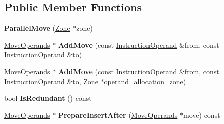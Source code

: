 \subsection*{Public Member Functions}
\begin{DoxyCompactItemize}
\item 
{\bfseries Parallel\+Move} (\hyperlink{classv8_1_1internal_1_1_zone}{Zone} $\ast$zone)\hypertarget{classv8_1_1internal_1_1compiler_1_1_parallel_move_aed2ca933d925ca250be848dc259c346e}{}\label{classv8_1_1internal_1_1compiler_1_1_parallel_move_aed2ca933d925ca250be848dc259c346e}

\item 
\hyperlink{classv8_1_1internal_1_1compiler_1_1_move_operands}{Move\+Operands} $\ast$ {\bfseries Add\+Move} (const \hyperlink{classv8_1_1internal_1_1compiler_1_1_instruction_operand}{Instruction\+Operand} \&from, const \hyperlink{classv8_1_1internal_1_1compiler_1_1_instruction_operand}{Instruction\+Operand} \&to)\hypertarget{classv8_1_1internal_1_1compiler_1_1_parallel_move_aaf0c874d2238b471f1fdfd94ff8b7245}{}\label{classv8_1_1internal_1_1compiler_1_1_parallel_move_aaf0c874d2238b471f1fdfd94ff8b7245}

\item 
\hyperlink{classv8_1_1internal_1_1compiler_1_1_move_operands}{Move\+Operands} $\ast$ {\bfseries Add\+Move} (const \hyperlink{classv8_1_1internal_1_1compiler_1_1_instruction_operand}{Instruction\+Operand} \&from, const \hyperlink{classv8_1_1internal_1_1compiler_1_1_instruction_operand}{Instruction\+Operand} \&to, \hyperlink{classv8_1_1internal_1_1_zone}{Zone} $\ast$operand\+\_\+allocation\+\_\+zone)\hypertarget{classv8_1_1internal_1_1compiler_1_1_parallel_move_a814609dc9d73a7e4c4ff72951d8e2d16}{}\label{classv8_1_1internal_1_1compiler_1_1_parallel_move_a814609dc9d73a7e4c4ff72951d8e2d16}

\item 
bool {\bfseries Is\+Redundant} () const \hypertarget{classv8_1_1internal_1_1compiler_1_1_parallel_move_a443819215f9ee8c0e744df775a2b0be6}{}\label{classv8_1_1internal_1_1compiler_1_1_parallel_move_a443819215f9ee8c0e744df775a2b0be6}

\item 
\hyperlink{classv8_1_1internal_1_1compiler_1_1_move_operands}{Move\+Operands} $\ast$ {\bfseries Prepare\+Insert\+After} (\hyperlink{classv8_1_1internal_1_1compiler_1_1_move_operands}{Move\+Operands} $\ast$move) const \hypertarget{classv8_1_1internal_1_1compiler_1_1_parallel_move_ac050454a54d503f5e1e0f411d4279359}{}\label{classv8_1_1internal_1_1compiler_1_1_parallel_move_ac050454a54d503f5e1e0f411d4279359}

\end{DoxyCompactItemize}
